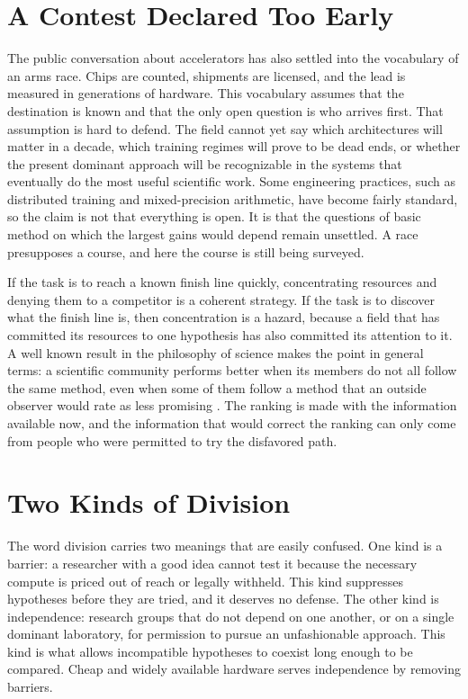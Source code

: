 \documentclass[12pt]{article}
\begin{document}
\section{A Contest Declared Too Early}

The public conversation about accelerators has also settled into the vocabulary of an arms race. Chips are counted, shipments are licensed, and the lead is measured in generations of hardware. This vocabulary assumes that the destination is known and that the only open question is who arrives first. That assumption is hard to defend. The field cannot yet say which architectures will matter in a decade, which training regimes will prove to be dead ends, or whether the present dominant approach will be recognizable in the systems that eventually do the most useful scientific work. Some engineering practices, such as distributed training and mixed-precision arithmetic, have become fairly standard, so the claim is not that everything is open. It is that the questions of basic method on which the largest gains would depend remain unsettled. A race presupposes a course, and here the course is still being surveyed.

If the task is to reach a known finish line quickly, concentrating resources and denying them to a competitor is a coherent strategy. If the task is to discover what the finish line is, then concentration is a hazard, because a field that has committed its resources to one hypothesis has also committed its attention to it. A well known result in the philosophy of science makes the point in general terms: a scientific community performs better when its members do not all follow the same method, even when some of them follow a method that an outside observer would rate as less promising \cite{kitcher1990}. The ranking is made with the information available now, and the information that would correct the ranking can only come from people who were permitted to try the disfavored path.

\section{Two Kinds of Division}

The word division carries two meanings that are easily confused. One kind is a barrier: a researcher with a good idea cannot test it because the necessary compute is priced out of reach or legally withheld. This kind suppresses hypotheses before they are tried, and it deserves no defense. The other kind is independence: research groups that do not depend on one another, or on a single dominant laboratory, for permission to pursue an unfashionable approach. This kind is what allows incompatible hypotheses to coexist long enough to be compared. Cheap and widely available hardware serves independence by removing barriers.
\end{document}
